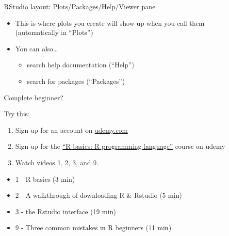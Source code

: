 \documentclass[
  ignorenonframetext,
]{beamer}
\providecommand{\tightlist}{%
  \setlength{\itemsep}{0pt}\setlength{\parskip}{0pt}}
\begin{document}
\begin{frame}{RStudio layout: Plots/Packages/Help/Viewer pane}
\protect\hypertarget{rstudio-layout-plotspackageshelpviewer-pane}{}

\begin{itemize}
\tightlist
\item
  This is where plots you create will show up when you call them
  (automatically in ``Plots'')
\item
  You can also\ldots{}

  \begin{itemize}
  \tightlist
  \item
    search help documentation (``Help'')
  \item
    search for packages (``Packages'')
  \end{itemize}
\end{itemize}

\end{frame}

\begin{frame}{Complete beginner?}
\protect\hypertarget{complete-beginner}{}

\begin{block}{Try this:}

\begin{enumerate}
\item
  Sign up for an account on \url{udemy.com}
\item
  Sign up for the \href{https://www.udemy.com/r-basics/}{``R basics: R
  programming language''} course on udemy
\item
  Watch videos 1, 2, 3, and 9.
\end{enumerate}

\begin{itemize}
\tightlist
\item
  1 - R basics (3 min)
\item
  2 - A walkthrough of downloading R \& Rstudio (5 min)
\item
  3 - the Rstudio interface (19 min)
\item
  9 - Three common mistakes in R beginners (11 min)
\end{itemize}

\end{block}

\end{frame}
\end{document}
